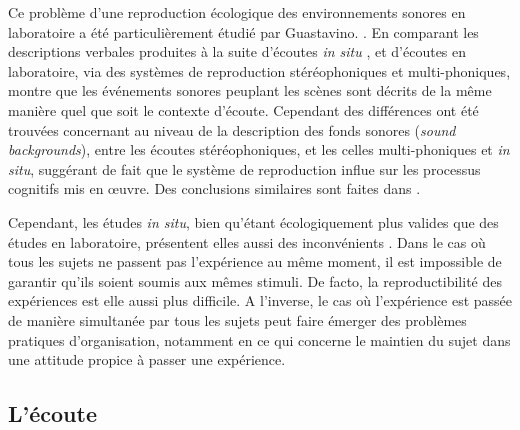 Ce problème d'une reproduction écologique des environnements sonores en laboratoire a été particulièrement étudié par Guastavino. \citep{guastavino2003approche,guastavino2004perceptual,guastavino2005ecological}. En comparant les descriptions verbales produites à la suite d'écoutes \emph{in situ} , et d'écoutes en laboratoire, via des systèmes de reproduction stéréophoniques et multi-phoniques, \citep{guastavino2005ecological} montre que les événements sonores peuplant les scènes sont décrits de la même manière quel que soit le contexte d'écoute. Cependant des différences ont été trouvées concernant  au niveau de la description des fonds sonores (\emph{sound backgrounds}), entre les écoutes stéréophoniques, et les celles multi-phoniques et \emph{in situ}, suggérant de fait que le système de reproduction influe sur les processus cognitifs mis en œuvre. Des conclusions similaires sont faites dans \citep{guastavino2004perceptual}  .

Cependant, les études \emph{in situ}, bien qu'étant écologiquement plus valides que des études en laboratoire, présentent elles aussi des inconvénients . Dans le cas où tous les sujets ne passent pas l'expérience au même moment, il est impossible de garantir qu'ils soient soumis aux mêmes stimuli. De facto, la reproductibilité des expériences est elle aussi plus difficile. A l'inverse, le cas où l'expérience est passée de manière simultanée par tous les sujets peut faire émerger des problèmes pratiques d'organisation, notamment en ce qui concerne le maintien du sujet dans une attitude propice à passer une expérience.

\subsection{L'écoute}

